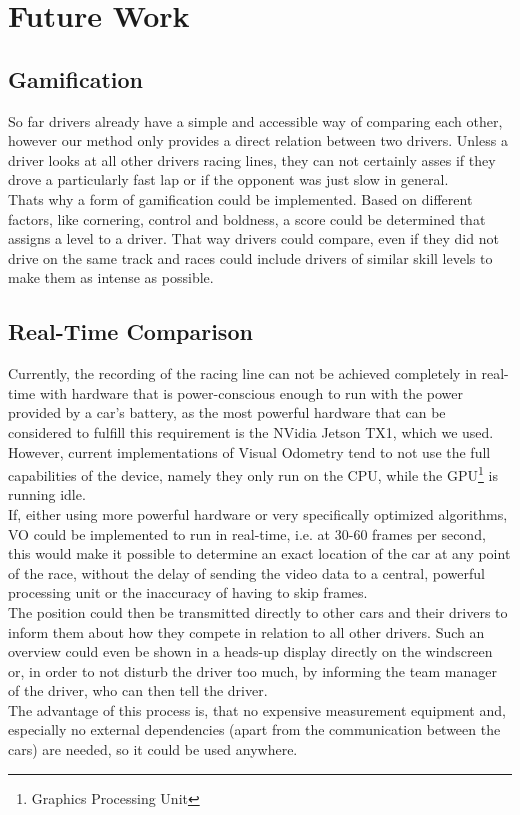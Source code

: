 \section{Future Work}
\label{sec:future_work}

\subsection{Gamification}
\label{sec:gamification}
So far drivers already have a simple and accessible way of comparing each other, however our method only provides a direct relation between two drivers. Unless a driver looks at all other drivers racing lines, they can not certainly asses if they drove a particularly fast lap or if the opponent was just slow in general.\\
Thats why a form of gamification could be implemented. Based on different factors, like cornering, control and boldness, a score could be determined that assigns a level to a driver. That way drivers could compare, even if they did not drive on the same track and races could include drivers of similar skill levels to make them as intense as possible.

\subsection{Real-Time Comparison}
Currently, the recording of the racing line can not be achieved completely in real-time with hardware that is power-conscious enough to run with the power provided by a car's battery, as the most powerful hardware that can be considered to fulfill this requirement is the NVidia Jetson TX1, which we used. However, current implementations of Visual Odometry tend to not use the full capabilities of the device, namely they only run on the CPU, while the GPU\footnote{Graphics Processing Unit} is running idle.\\
If, either using more powerful hardware or very specifically optimized algorithms, VO could be implemented to run in real-time, i.e. at 30-60 frames per second, this would make it possible to determine an exact location of the car at any point of the race, without the delay of sending the video data to a central, powerful processing unit or the inaccuracy of having to skip frames.\\
The position could then be transmitted directly to other cars and their drivers to inform them about how they compete in relation to all other drivers. Such an overview could even be shown in a heads-up display directly on the windscreen or, in order to not disturb the driver too much, by informing the team manager of the driver, who can then tell the driver.\\
The advantage of this process is, that no expensive measurement equipment and, especially no external dependencies (apart from the communication between the cars) are needed, so it could be used anywhere.

